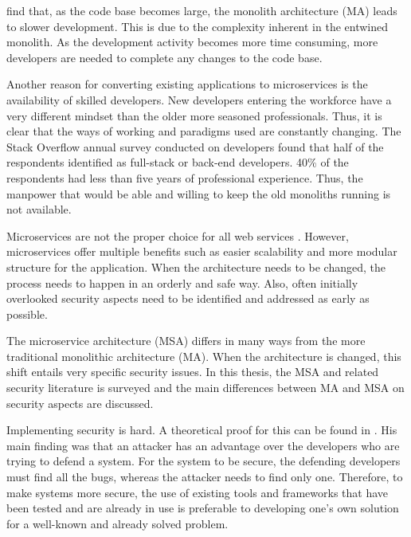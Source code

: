 \begin{sloppypar}
    \citet{10.1007/978-3-319-74433-9_3} find that, as the code base becomes
    large, the monolith architecture (MA) leads to slower development. This is
    due to the complexity inherent in the entwined monolith. As the development
    activity becomes more time consuming, more developers are needed to complete
    any changes to the code base.
\end{sloppypar}
\begin{sloppypar}
    Another reason for converting existing applications to microservices is the
    availability of skilled developers. New developers entering the workforce
    have a very different mindset than the older more seasoned professionals.
    Thus, it is clear that the ways of working and paradigms used are constantly
    changing. The Stack Overflow annual survey \citep{sosurvey2019} conducted on
    developers found that half of the respondents identified as full-stack or
    back-end developers. 40\% of the respondents had less than five years of
    professional experience. Thus, the manpower that would be able and willing
    to keep the old monoliths running is not available.
\end{sloppypar}
\begin{sloppypar}
    Microservices are not the proper choice for all web services
    \citep{newman2019}. However, microservices offer multiple benefits such as
    easier scalability and more modular structure for the application. When the
    architecture needs to be changed, the process needs to happen in an orderly
    and safe way. Also, often initially overlooked security aspects need to be
    identified and addressed as early as possible.
\end{sloppypar}
\begin{sloppypar}
    The microservice architecture (MSA) differs in many ways from the more
    traditional monolithic architecture (MA). When the architecture is changed,
    this shift entails very specific security issues. In this thesis, the MSA
    and related security literature is surveyed and the main differences between
    MA and MSA on security aspects are discussed.
\end{sloppypar}
\begin{sloppypar}
    Implementing security is hard. A theoretical proof for this can be found in
    \citet{andersson2001information}. His main finding was that an attacker has
    an advantage over the developers who are trying to defend a system. For the
    system to be secure, the defending developers must find all the bugs,
    whereas the attacker needs to find only one. Therefore, to make systems more
    secure, the use of existing tools and frameworks that have been tested and
    are already in use is preferable to developing one's own solution for a
    well-known and already solved problem.
\end{sloppypar}
